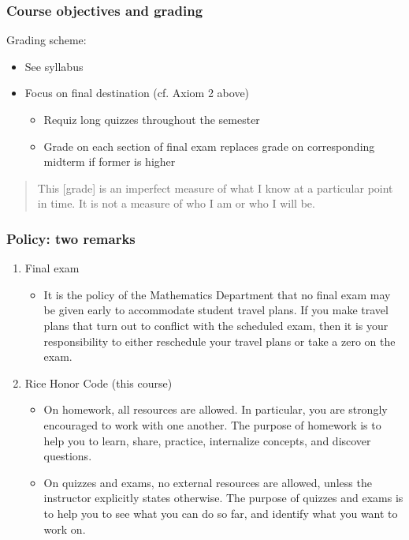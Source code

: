 \documentclass[blue]{beamer}
\begin{document}
\begin{frame}
\frametitle{Course objectives and grading}

Grading scheme:

\begin{itemize}
    \item See syllabus
    \item Focus on final destination (cf. Axiom 2 above)
    \begin{itemize}
        \item Requiz long quizzes throughout the semester
        \item Grade on each section of final exam replaces grade on corresponding midterm if former is higher
    \end{itemize}
\end{itemize}

\vspace{0.25in}

\begin{quotation}
\noindent{}This [grade] is an imperfect measure of what I know at a particular point in time. It is not a measure of who I am or who I will be.
\end{quotation}
\end{frame}



\begin{frame}
\frametitle{Policy: two remarks}

\begin{enumerate}
    \item Final exam
    \begin{itemize}
        \item It is the policy of the Mathematics Department that no final exam may be given early to accommodate student travel plans. If you make travel plans that turn out to conflict with the scheduled exam, then it is your responsibility to either reschedule your travel plans or take a zero on the exam.
    \end{itemize}
    \item Rice Honor Code (this course)
    \begin{itemize}
        \item On homework, all resources are allowed. In particular, you are strongly encouraged to work with one another. The purpose of homework is to help you to learn, share, practice, internalize concepts, and discover questions.
        \item On quizzes and exams, no external resources are allowed, unless the instructor explicitly states otherwise. The purpose of quizzes and exams is to help you to see what you can do so far, and identify what you want to work on.
    \end{itemize}
\end{enumerate}
\end{frame}
\end{document}

